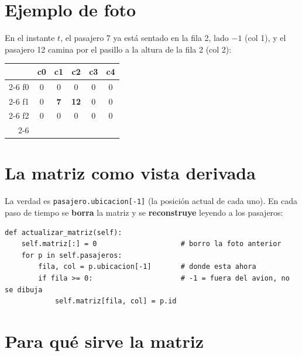 \documentclass[11pt,a4paper]{article}
\begin{document}
\section{Ejemplo de foto}

En el instante $t$, el pasajero 7 ya está sentado en la fila 2, lado $-1$ (col 1),
y el pasajero 12 camina por el pasillo a la altura de la fila 2 (col 2):

\begin{center}
\begin{tabular}{r|c|c|c|c|c|}
\multicolumn{1}{r}{} & \multicolumn{1}{c}{\scriptsize c0} & \multicolumn{1}{c}{\scriptsize c1} & \multicolumn{1}{c}{\scriptsize c2} & \multicolumn{1}{c}{\scriptsize c3} & \multicolumn{1}{c}{\scriptsize c4} \\
\cline{2-6}
f0 & 0 & 0 & 0 & 0 & 0 \\ \cline{2-6}
f1 & 0 & \textbf{7} & \textbf{12} & 0 & 0 \\ \cline{2-6}
f2 & 0 & 0 & 0 & 0 & 0 \\ \cline{2-6}
\multicolumn{6}{c}{\scriptsize $\vdots$} \\
\end{tabular}
\end{center}

\section{La matriz como vista derivada}

La verdad es \texttt{pasajero.ubicacion[-1]} (la posición actual de cada uno). En cada
paso de tiempo se \textbf{borra} la matriz y se \textbf{reconstruye} leyendo a los
pasajeros:

\begin{lstlisting}
def actualizar_matriz(self):
    self.matriz[:] = 0                    # borro la foto anterior
    for p in self.pasajeros:
        fila, col = p.ubicacion[-1]       # donde esta ahora
        if fila >= 0:                     # -1 = fuera del avion, no se dibuja
            self.matriz[fila, col] = p.id
\end{lstlisting}

\section{Para qué sirve la matriz}
\end{document}
